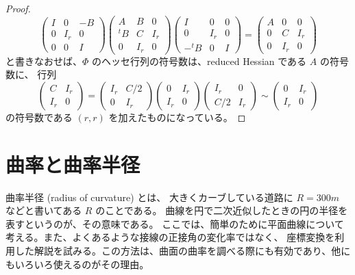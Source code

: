 \documentclass[a4paper]{jsarticle}
\theoremstyle{definition}
\theoremstyle{remark}
\begin{document}
\begin{proof}
\[\begin{pmatrix}
I & 0 & -B\\
0 & I_r & 0\\
0 & 0 & I
\end{pmatrix}
\begin{pmatrix}
A & B & 0\\
{}^tB & C & I_r\\
0 & I_r & 0 
\end{pmatrix} 
\begin{pmatrix}
I & 0 & 0\\
0 & I_r & 0\\
-{}^tB & 0 & I
\end{pmatrix} 
=
\begin{pmatrix}
A & 0 & 0\\
0 & C & I_r\\
0 & I_r & 0
\end{pmatrix}
\]
と書きなおせば、$\Phi$ のヘッセ行列の符号数は、reduced Hessian である $A$ の符号数に、
行列
\[
\begin{pmatrix}
C & I_r\\
I_r & 0
\end{pmatrix}
=
\begin{pmatrix}
I_r & C/2\\
0 & I_r
\end{pmatrix}
\begin{pmatrix}
0 & I_r\\
I_r & 0
\end{pmatrix}
\begin{pmatrix}
I_r & 0\\
C/2 & I_r  
\end{pmatrix}
\sim 
\begin{pmatrix}
0 & I_r\\
I_r & 0
\end{pmatrix}
\]
の符号数である $(r,r)$ を加えたものになっている。
\end{proof}

\section{曲率と曲率半径}
曲率半径 (radius of curvature) とは、
大きくカーブしている道路に $R=300m$ などと書いてある $R$ のことである。
曲線を円で二次近似したときの円の半径を表すというのが、その意味である。
ここでは、簡単のために平面曲線について考える。また、よくあるような接線の正接角の変化率ではなく、
座標変換を利用した解説を試みる。この方法は、曲面の曲率を調べる際にも有効であり、他にもいろいろ使えるのがその理由。
\end{document}
